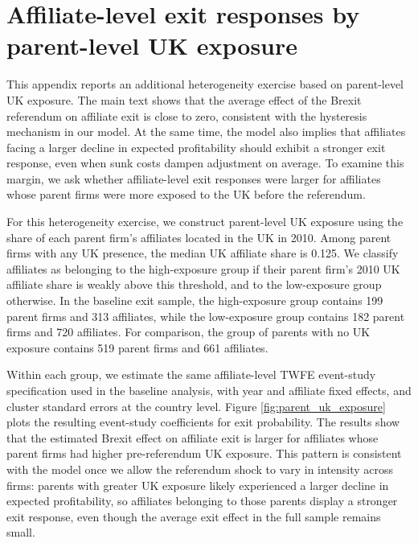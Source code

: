 \documentclass[preprint,11pt,authoryear]{elsarticle}
\begin{document}
{\renewcommand\normalsize{\scriptsize}%
\normalsize 

}


{\renewcommand\normalsize{\scriptsize}%
\normalsize 

}



\clearpage
\section{Affiliate-level exit responses by parent-level UK exposure}\label{sec:parent_uk_exposure}

This appendix reports an additional heterogeneity exercise based on parent-level UK exposure. The main text shows that the average effect of the Brexit referendum on affiliate exit is close to zero, consistent with the hysteresis mechanism in our model. At the same time, the model also implies that affiliates facing a larger decline in expected profitability should exhibit a stronger exit response, even when sunk costs dampen adjustment on average. To examine this margin, we ask whether affiliate-level exit responses were larger for affiliates whose parent firms were more exposed to the UK before the referendum.

For this heterogeneity exercise, we construct parent-level UK exposure using the share of each parent firm’s affiliates located in the UK in 2010. Among parent firms with any UK presence, the median UK affiliate share is 0.125. We classify affiliates as belonging to the high-exposure group if their parent firm’s 2010 UK affiliate share is weakly above this threshold, and to the low-exposure group otherwise. In the baseline exit sample, the high-exposure group contains 199 parent firms and 313 affiliates, while the low-exposure group contains 182 parent firms and 720 affiliates. For comparison, the group of parents with no UK exposure contains 519 parent firms and 661 affiliates.

Within each group, we estimate the same affiliate-level TWFE event-study specification used in the baseline analysis, with year and affiliate fixed effects, and cluster standard errors at the country level. Figure \ref{fig:parent_uk_exposure} plots the resulting event-study coefficients for exit probability.
The results show that the estimated Brexit effect on affiliate exit is larger for affiliates whose parent firms had higher pre-referendum UK exposure. This pattern is consistent with the model once we allow the referendum shock to vary in intensity across firms: parents with greater UK exposure likely experienced a larger decline in expected profitability, so affiliates belonging to those parents display a stronger exit response, even though the average exit effect in the full sample remains small. 
\end{document}
